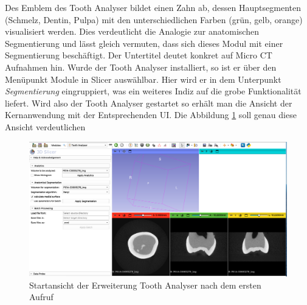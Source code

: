 Des Emblem des Tooth Analyser bildet einen Zahn ab, dessen Hauptsegmenten (Schmelz,
Dentin, Pulpa) mit den unterschiedlichen Farben (grün, gelb, orange)
visualisiert werden. Dies verdeutlicht die Analogie zur anatomischen Segmentierung
und lässt gleich vermuten, dass sich dieses Modul mit einer Segmentierung
beschäftigt. Der Untertitel deutet konkret auf Micro \ac{CT} Aufnahmen hin. Wurde
der Tooth Analyser installiert, so ist er über den Menüpunkt Module in Slicer
auswählbar. Hier wird er in dem Unterpunkt \textit{Segmentierung} eingruppiert, was
ein weiteres Indiz auf die grobe Funktionalität liefert. Wird also der Tooth
Analyser gestartet so erhält man die Ansicht der Kernanwendung mit der
Entsprechenden \ac{UI}. Die Abbildung \ref{fig:tooth_analyser_start_up} soll
genau diese Ansicht verdeutlichen

\begin{figure}[h]
	\centering
	\includegraphics[scale=0.2, width=\textwidth]{img/toothAnalyserStarUp.png}
	\caption{Startansicht der Erweiterung Tooth Analyser nach dem ersten Aufruf}
	\label{fig:tooth_analyser_start_up}
\end{figure}

